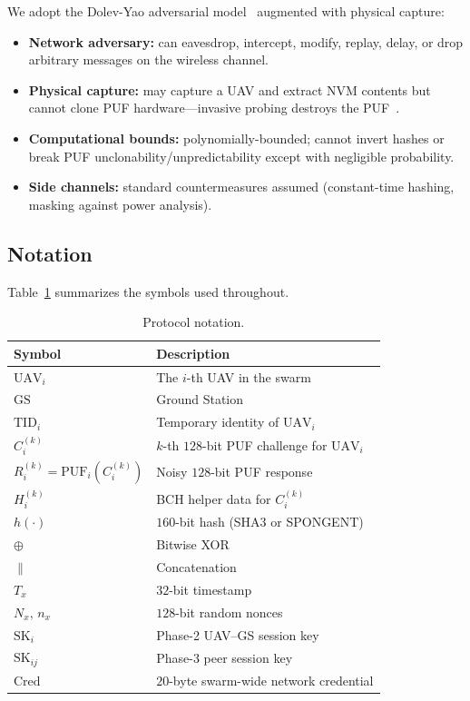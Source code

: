 \documentclass[journal,a4paper,10pt]{IEEEtran}
\begin{document}
We adopt the Dolev-Yao adversarial model~\cite{dolev_yao} augmented
with physical capture:
\begin{itemize}[leftmargin=*]
\item \textbf{Network adversary:} can eavesdrop, intercept, modify,
  replay, delay, or drop arbitrary messages on the wireless channel.
\item \textbf{Physical capture:} may capture a UAV and extract NVM
  contents but cannot clone PUF hardware---invasive probing destroys
  the PUF~\cite{puf_iot_strong_adversary}.
\item \textbf{Computational bounds:} polynomially-bounded; cannot
  invert hashes or break PUF unclonability/unpredictability except
  with negligible probability.
\item \textbf{Side channels:} standard countermeasures assumed
  (constant-time hashing, masking against power analysis).
\end{itemize}

\subsection{Notation}
Table~\ref{tab:notation} summarizes the symbols used throughout.

\begin{table}[t]
\centering
\caption{Protocol notation.}
\label{tab:notation}
\begin{tabular}{@{}ll@{}}
\toprule
\textbf{Symbol} & \textbf{Description} \\
\midrule
$\mathrm{UAV}_i$            & The $i$-th UAV in the swarm \\
$\mathrm{GS}$               & Ground Station \\
$\mathrm{TID}_i$            & Temporary identity of $\mathrm{UAV}_i$ \\
$C_i^{(k)}$                 & $k$-th $128$-bit PUF challenge for $\mathrm{UAV}_i$ \\
$R_i^{(k)}{=}\mathrm{PUF}_i(C_i^{(k)})$ & Noisy $128$-bit PUF response \\
$H_i^{(k)}$                 & BCH helper data for $C_i^{(k)}$ \\
$h(\cdot)$                  & $160$-bit hash (SHA3 or SPONGENT) \\
$\oplus$                    & Bitwise XOR \\
$\|$                        & Concatenation \\
$T_x$                       & $32$-bit timestamp \\
$N_x,\,n_x$                 & $128$-bit random nonces \\
$\mathrm{SK}_i$             & Phase-2 UAV--GS session key \\
$\mathrm{SK}_{ij}$          & Phase-3 peer session key \\
$\mathrm{Cred}$             & $20$-byte swarm-wide network credential \\
\bottomrule
\end{tabular}
\end{table}
\end{document}
